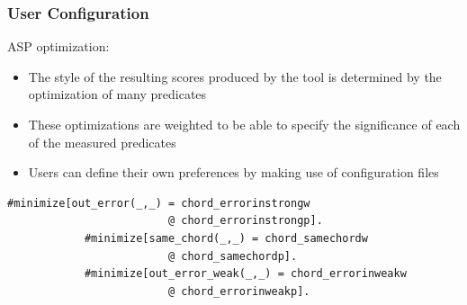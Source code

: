 \documentclass[english,handout]{beamer}
\begin{document}
	\begin{frame}[fragile]
	\frametitle{User Configuration}
		ASP optimization:
		\begin{itemize}
			\item The \alert{style} of the resulting scores produced by the tool is determined by the optimization of many predicates
			\pause
			\item These optimizations are \alert{weighted} to be able to specify the significance of each of the measured predicates
			\pause
			\item Users can \alert{define their own preferences} by making use of configuration files
		\end{itemize}
		\begin{Verbatim}[frame=single]
			#minimize[out_error(_,_) = chord_errorinstrongw 
                         @ chord_errorinstrongp].
			#minimize[same_chord(_,_) = chord_samechordw
                         @ chord_samechordp].
			#minimize[out_error_weak(_,_) = chord_errorinweakw 
                         @ chord_errorinweakp].
		\end{Verbatim}
	\end{frame}
\end{document}
